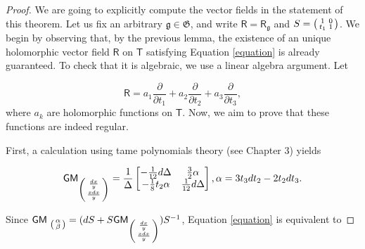 \documentclass{article}
\numberwithin{equation}{section}
\numberwithin{figure}{section}
\theoremstyle{plain}
\theoremstyle{definition}
\numberwithin{equation}{section}
\newtheorem[S, bodystyle=\normalfont\noindent]{defiS}{Definition}[section]
\begin{document}
\begin{proof}
We are going to explicitly compute the vector fields in the statement of this theorem. Let us fix an arbitrary $\mathfrak{g}\in \mathfrak{G}$, and write $\mathsf{R}=\mathsf{R}_{\mathfrak{g}}$ and $S=\begin{psmallmatrix}1 & 0\\  t_1 & 1\end{psmallmatrix}$. We begin by observing that, by the previous lemma, the existence of an unique holomorphic vector field $\mathsf{R}$ on $\mathsf{T}$ satisfying Equation \ref{equation} is already guaranteed. To check that it is algebraic, we use a linear algebra argument. Let 

\begin{equation}
\mathsf{R}=a_1\frac{\partial}{\partial t_1}+ a_2\frac{\partial}{\partial t_2}+a_3\frac{\partial}{\partial t_3}, 
\end{equation} 
where $a_k$ are holomorphic functions on $\mathsf{T}$. Now, we aim to prove that these functions are indeed regular.

First, a calculation using tame polynomials theory (see Chapter 3) yields

\begin{equation}
\mathsf{GM}_{\begin{psmallmatrix}\frac{dx}{y}\\ \frac{xdx}{y}\end{psmallmatrix}}=
\frac{1}{\Delta}\begin{bmatrix}
-\frac{1}{12}d\Delta & \frac{3}{2} \alpha\\
-\frac{1}{8}t_2\alpha & \frac{1}{12}d\Delta 
\end{bmatrix}, \alpha=3t_3dt_2-2t_2dt_3.
\end{equation}

Since $\mathsf{GM}_{\
\begin{psmallmatrix}\alpha\\\beta
\end{psmallmatrix}
}=(dS+S\mathsf{GM}_{\begin{psmallmatrix}\frac{dx}{y}\\ \frac{xdx}{y}\end{psmallmatrix}})S^{-1}$, Equation \ref{equation} is equivalent to 



\end{proof}
\end{document}
